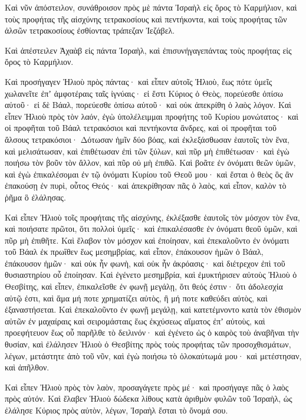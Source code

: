 {Καὶ νῦν ἀπόστειλον, συνάθροισον πρὸς μὲ πάντα Ἰσραὴλ εἰς ὄρος τὸ Καρμήλιον, καὶ τοὺς προφήτας τῆς αἰσχύνης τετρακοσίους καὶ πεντήκοντα, καὶ τοὺς προφήτας τῶν ἀλσῶν τετρακοσίους ἐσθίοντας τράπεζαν Ἰεζάβελ.
\par }{\PP {}Καὶ ἀπέστειλεν Ἀχαὰβ εἰς πάντα Ἰσραὴλ, καὶ ἐπισυνήγαγεπάντας τοὺς προφήτας εἰς ὄρος τὸ Καρμήλιον.
\par }{\PP {}Καὶ προσήγαγεν Ἠλιοὺ πρὸς πάντας· καὶ εἶπεν αὐτοῖς Ἠλιοὺ, ἕως πότε ὑμεῖς χωλανεῖτε ἐπʼ ἀμφοτέραις ταῖς ἰγνύαις· εἰ ἔστι Κύριος ὁ Θεὸς, πορεύεσθε ὀπίσω αὐτοῦ· εἰ δὲ Βάαλ, πορεύεσθε ὀπίσω αὐτοῦ· καὶ οὐκ ἀπεκρίθη ὁ λαὸς λόγον.
Καὶ εἶπεν Ἠλιοὺ πρὸς τὸν λαόν, ἐγὼ ὑπολέλειμμαι προφήτης τοῦ Κυρίου μονώτατος· καὶ οἱ προφῆται τοῦ Βάαλ τετρακόσιοι καὶ πεντήκοντα ἄνδρες, καὶ οἱ προφῆται τοῦ ἄλσους τετρακόσιοι·
Δότωσαν ἡμῖν δύο βόας, καὶ ἐκλεξάσθωσαν ἑαυτοῖς τὸν ἕνα, καὶ μελισάτωσαν, καὶ ἐπιθέτωσαν ἐπὶ τῶν ξύλων, καὶ πῦρ μὴ ἐπιθέτωσαν· καὶ ἐγὼ ποιήσω τὸν βοῦν τὸν ἄλλον, καὶ πῦρ οὐ μὴ ἐπιθῶ.
Καὶ βοᾶτε ἐν ὀνόματι θεῶν ὑμῶν, καὶ ἐγὼ ἐπικαλέσομαι ἐν τῷ ὀνόματι Κυρίου τοῦ Θεοῦ μου· καὶ ἔσται ὁ θεὸς ὃς ἂν ἐπακούσῃ ἐν πυρὶ, οὗτος Θεός· καὶ ἀπεκρίθησαν πᾶς ὁ λαὸς, καὶ εἶπον, καλὸν τὸ ῥῆμα ὃ ἐλάλησας.
\par }{\PP {}Καὶ εἶπεν Ἠλιοὺ τοῖς προφήταις τῆς αἰσχύνης, ἐκλέξασθε ἑαυτοῖς τὸν μόσχον τὸν ἕνα, καὶ ποιήσατε πρῶτοι, ὅτι πολλοὶ ὑμεῖς· καὶ ἐπικαλέσασθε ἐν ὀνόματι θεοῦ ὑμῶν, καὶ πῦρ μὴ ἐπιθῆτε.
Καὶ ἔλαβον τὸν μόσχον καὶ ἐποίησαν, καὶ ἐπεκαλοῦντο ἐν ὀνόματι τοῦ Βάαλ ἐκ πρωΐθεν ἕως μεσημβρίας, καὶ εἶπον, ἐπάκουσον ἡμῶν ὁ Βάαλ, ἐπάκουσον ἡμῶν· καὶ οὐκ ἦν φωνὴ, καὶ οὐκ ἦν ἀκρόασις· καὶ διέτρεχον ἐπὶ τοῦ θυσιαστηρίου οὗ ἐποίησαν.
Καὶ ἐγένετο μεσημβρία, καὶ ἐμυκτήρισεν αὐτοὺς Ἠλιοὺ ὁ Θεσβίτης, καὶ εἶπεν, ἐπικαλεῖσθε ἐν φωνῇ μεγάλῃ, ὅτι θεός ἐστιν· ὅτι ἀδολεσχία αὐτῷ ἐστι, καὶ ἅμα μή ποτε χρηματίζει αὐτὸς, ἢ μή ποτε καθεύδει αὐτὸς, καὶ ἐξαναστήσεται.
Καὶ ἐπεκαλοῦντο ἐν φωνῇ μεγάλῃ, καὶ κατετέμνοντο κατὰ τὸν ἐθισμὸν αὐτῶν ἐν μαχαίραις καὶ σειρομάσταις ἕως ἐκχύσεως αἵματος ἐπʼ αὐτοὺς,
καὶ προεφήτευον ἕως οὗ παρῆλθε τὸ δειλινόν· καὶ ἐγένετο ὡς ὁ καιρὸς τοὺ ἀναβῆναι τὴν θυσίαν, καὶ ἐλάλησεν Ἠλιοὺ ὁ Θεσβίτης πρὸς τοὺς προφήτας τῶν προσοχθισμάτων, λέγων, μετάστητε ἀπὸ τοῦ νῦν, καὶ ἐγὼ ποιήσω τὸ ὁλοκαύτωμά μου· καὶ μετέστησαν, καὶ ἀπῆλθον.
\par }{\PP {}Καὶ εἶπεν Ἠλιοὺ πρὸς τὸν λαὸν, προσαγάγετε πρὸς μέ· καὶ προσήγαγε πᾶς ὁ λαὸς πρὸς αὐτόν.
Καὶ ἔλαβεν Ἡλιοὺ δώδεκα λίθους κατὰ ἀριθμὸν φυλῶν τοῦ Ἰσραὴλ, ὡς ἐλάλησε Κύριος πρὸς αὐτὸν, λέγων, Ἰσραὴλ ἔσται τὸ ὄνομά σου.
}
